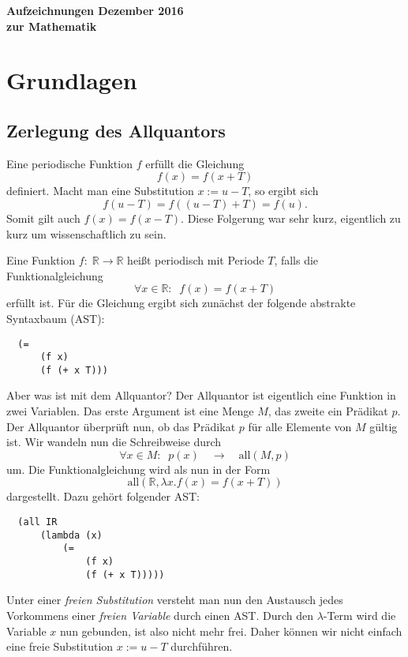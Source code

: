\documentclass[a4paper,10pt,fleqn,twocolumn,twoside]{scrartcl}
\numberwithin{equation}{section}
\begin{document}
\noindent
{\LARGE\sffamily\bfseries Aufzeichnungen
{\mdseries\rmfamily\large\hfill Dezember 2016}\\
zur Mathematik\par}


\tableofcontents

\section{Grundlagen}
\subsection{Zerlegung des Allquantors}
Eine periodische Funktion $f$ erfüllt die Gleichung
\begin{equation}
f(x) = f(x+T)
\end{equation}
definiert. Macht man eine Substitution $x:=u-T$, so ergibt sich
\begin{equation}
f(u-T) = f((u-T)+T) = f(u).
\end{equation}
Somit gilt auch $f(x)=f(x-T)$. Diese Folgerung war sehr kurz,
eigentlich zu kurz um wissenschaftlich zu sein.

Eine Funktion $f{:}\;\mathbb R\rightarrow\mathbb R$
heißt periodisch mit Periode $T$, falls die
Funktionalgleichung
\begin{equation}
\forall x{\in}\mathbb R{:}\;\; f(x) = f(x+T)
\end{equation}
erfüllt ist. Für die Gleichung ergibt sich zunächst
der folgende abstrakte Syntaxbaum (AST):
\begin{verbatim}
  (=
      (f x)
      (f (+ x T)))
\end{verbatim}
Aber was ist mit dem Allquantor? Der Allquantor ist eigentlich
eine Funktion in zwei Variablen. Das erste Argument ist eine Menge $M$,
das zweite ein Prädikat $p$. Der Allquantor überprüft nun, ob das
Prädikat $p$ für alle Elemente von $M$ gültig ist. Wir wandeln nun
die Schreibweise durch
\begin{equation}
\forall x{\in}M{:}\;\; p(x)\quad\longrightarrow\quad
\mathrm{all}(M,p)
\end{equation}
um. Die Funktionalgleichung wird als nun in der Form
\begin{equation}\label{periodisch-all}
\mathrm{all}(\mathbb R,\lambda x. f(x) = f(x+T))
\end{equation}
dargestellt. Dazu gehört folgender AST:
\begin{verbatim}
  (all IR
      (lambda (x)
          (=
              (f x)
              (f (+ x T)))))
\end{verbatim}
Unter einer \textit{freien Substitution} versteht man nun den
Austausch jedes Vorkommens einer \textit{freien Variable}
durch einen AST. Durch den $\lambda$-Term wird die
Variable $x$ nun gebunden, ist also nicht mehr frei.
Daher können wir nicht einfach eine freie Substitution
$x{:=}u{-}T$ durchführen.
\end{document}
